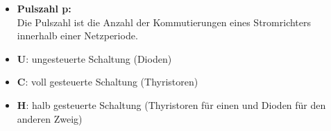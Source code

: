 
\begin{itemize}
    \item \textbf{Pulszahl p:}\\
    Die Pulszahl ist die Anzahl der Kommutierungen eines Stromrichters innerhalb einer Netzperiode.\\
\end{itemize}


\begin{itemize}
    \item \textbf{U}: ungesteuerte Schaltung (Dioden)
    \item \textbf{C}: voll gesteuerte Schaltung (Thyristoren)
    \item \textbf{H}: halb gesteuerte Schaltung (Thyristoren für einen und Dioden für den anderen Zweig)\\
\end{itemize}

\newpage
